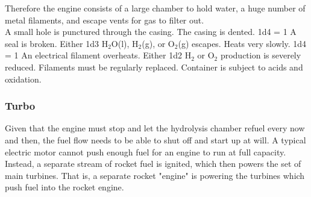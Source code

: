 \documentclass[a4paper]{article}
\begin{document}
Therefore the engine consists of a large chamber to hold water, a huge number of metal filaments, and escape vents for gas to filter out.
\\ \pbhw
{A small hole is punctured through the casing. \newline {}}
{The casing is dented. \newline 1d4 = 1 A seal is broken. Either 1d3 H$_2$O(l), H$_2$(g), or O$_2$(g) escapes.}
{Heats very slowly. \newline 1d4 = 1 An electrical filament overheats. Either 1d2 H$_2$ or O$_2$ production is severely reduced.}
{Filaments must be regularly replaced. Container is subject to acids and oxidation.}


%

\vspace{-0.5cm} \hspace{-18pt} \subsubsection{Turbo} \label{engine_turbo} \vspace{-0.2cm}
Given that the engine must stop and let the hydrolysis chamber refuel every now and then, the fuel flow needs to be able to shut off and start up at will. A typical electric motor cannot push enough fuel for an engine to run at full capacity. Instead, a separate stream of rocket fuel is ignited, which then powers the set of main turbines. That is, a separate rocket "engine" is powering the turbines which push fuel into the rocket engine. 
\end{document}
